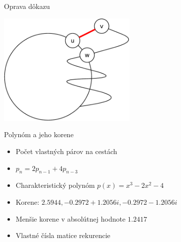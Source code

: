 \documentclass[slovak]{beamer}
\begin{document}
\begin{frame}{Oprava dôkazu}
    \begin{center}
        \includegraphics[width=0.5\textwidth]{grafy/posledny_krok.pdf}
    \end{center}
\end{frame}

\begin{frame}{Polynóm a jeho korene}
    \begin{itemize}
        \item Počet vlastných párov na cestách
        \item $p_n = 2p_{n-1} + 4p_{n-3}$
        \item Charakteristický polynóm $p(x) = x^3 - 2x^2 - 4$
        \item Korene: $2.5944, -0.2972 + 1.2056i, -0.2972 - 1.2056i$
        \item Menšie korene v absolútnej hodnote $1.2417$
        \item Vlastné čísla matice rekurencie
    \end{itemize}
\end{frame}
\end{document}
